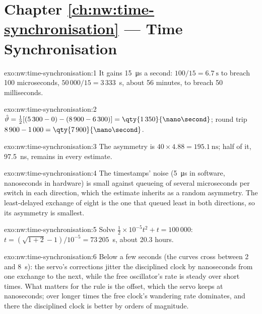 \section*{Chapter \ref{ch:nw:time-synchronisation} --- Time Synchronisation}

\begin{solution}{exo:nw:time-synchronisation:1}
It gains \qty{15}{\micro\second} a second: $100/15 = \qty{6.7}{\second}$ to breach 100 microseconds, $50\,000/15 = 3\,333$~s, about 56
minutes, to breach 50 milliseconds.
\end{solution}

\begin{solution}{exo:nw:time-synchronisation:2}
$\hat\vartheta = \tfrac12[(5\,300 - 0) - (8\,900 - 6\,300)] = \qty{1\,350}{\nano\second}$; round trip $8\,900 - 1\,000 =
\qty{7\,900}{\nano\second}$.
\end{solution}

\begin{solution}{exo:nw:time-synchronisation:3}
The asymmetry is $40 \times 4.88 = \qty{195.1}{\nano\second}$; half of it, \qty{97.5}{\nano\second}, remains in every estimate.
\end{solution}

\begin{solution}{exo:nw:time-synchronisation:4}
The timestamps' noise (\qty{5}{\micro\second} in software, nanoseconds in hardware) is small against queueing of several
microseconds per switch in each direction, which the estimate inherits as a random asymmetry. The least-delayed exchange of eight is
the one that queued least in both directions, so its asymmetry is smallest.
\end{solution}

\begin{solution}{exo:nw:time-synchronisation:5}
Solve $\tfrac12 \times 10^{-5} t^2 + t = 100\,000$: $t = (\sqrt{1 + 2} - 1)/10^{-5} = 73\,205$~s, about 20.3 hours.
\end{solution}

\begin{solution}{exo:nw:time-synchronisation:6}
Below a few seconds (the curves cross between 2 and 8~s): the servo's corrections jitter the disciplined clock by nanoseconds from one exchange to the next, while the free
oscillator's rate is steady over short times. What matters for the rule is the offset, which the servo keeps at nanoseconds; over
longer times the free clock's wandering rate dominates, and there the disciplined clock is better by orders of magnitude.
\end{solution}

